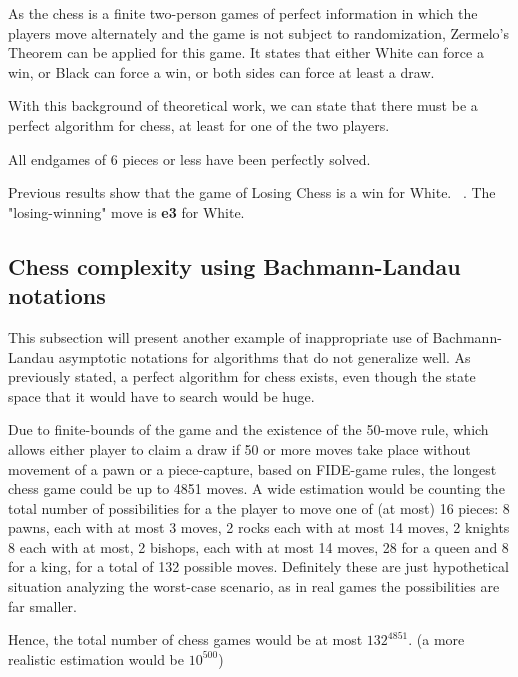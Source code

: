 \begin{remark}
As the chess is a finite two-person games of perfect information in which the players move alternately and the game is not subject to randomization, Zermelo's Theorem can be applied for this game. It states that either White can force a win, or Black can force a win, or both sides can force at least a draw.
\end{remark}

With this background of theoretical work, we can state that there must be a perfect algorithm for chess, at least for one of the two players.

\begin{remark}
All endgames of 6 pieces or less have been perfectly solved.
\end{remark}

\begin{remark}
Previous results show that the game of Losing Chess is a win for White. ~\cite{watkins2017losing}. The "losing-winning" move is \textbf{e3} for White.
\end{remark}


\subsection{Chess complexity using Bachmann-Landau notations}

This subsection will present another example of inappropriate use of Bachmann-Landau asymptotic notations for algorithms that do not generalize well. As previously stated, a perfect algorithm for chess exists, even though the state space that it would have to search would be huge. 

Due to finite-bounds of the game and the existence of the 50-move rule, which allows either player to claim a draw if 50 or more moves take place without movement of a pawn  or a piece-capture, based on FIDE-game rules, the longest chess game could be up to 4851 moves. A wide estimation would be counting the total number of possibilities for a the player to move one of (at most) 16 pieces: 8 pawns, each with at most 3 moves, 2 rocks each with at most 14 moves, 2 knights 8 each with at most, 2 bishops, each with at most 14 moves, 28 for a queen and 8 for a king, for a total of 132 possible moves. Definitely these are just hypothetical situation analyzing the worst-case scenario, as in real games the possibilities are far smaller.

Hence, the total number of chess games would be at most $132^{4851}$. (a more realistic estimation would be $10^{500}$)


